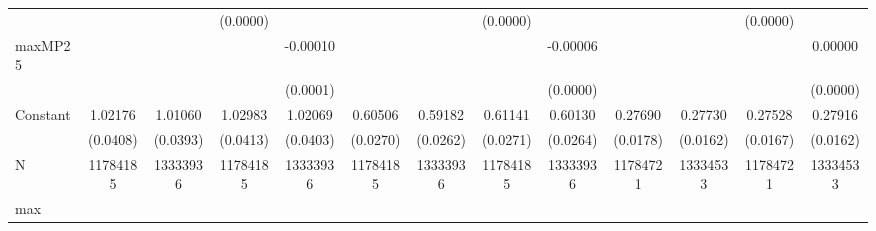 {\begin{tabular}{l*{12}{c}}
            &                     &                     &    (0.0000)         &                     &                     &                     &    (0.0000)         &                     &                     &                     &    (0.0000)         &                     \\
maxMP25     &                     &                     &                     &    -0.00010\sym{**} &                     &                     &                     &    -0.00006         &                     &                     &                     &     0.00000         \\
            &                     &                     &                     &    (0.0001)         &                     &                     &                     &    (0.0000)         &                     &                     &                     &    (0.0000)         \\
Constant    &     1.02176\sym{***}&     1.01060\sym{***}&     1.02983\sym{***}&     1.02069\sym{***}&     0.60506\sym{***}&     0.59182\sym{***}&     0.61141\sym{***}&     0.60130\sym{***}&     0.27690\sym{***}&     0.27730\sym{***}&     0.27528\sym{***}&     0.27916\sym{***}\\
            &    (0.0408)         &    (0.0393)         &    (0.0413)         &    (0.0403)         &    (0.0270)         &    (0.0262)         &    (0.0271)         &    (0.0264)         &    (0.0178)         &    (0.0162)         &    (0.0167)         &    (0.0162)         \\
\midrule
N           &    11784185         &    13333936         &    11784185         &    13333936         &    11784185         &    13333936         &    11784185         &    13333936         &    11784721         &    13334533         &    11784721         &    13334533         \\
max         &                     &                     &                     &                     &                     &                     &                     &                     &                     &                     &                     &                     \\
\bottomrule
\end{tabular}
}
